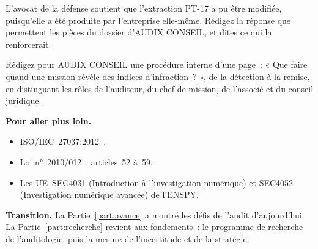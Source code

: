 \begin{boxexo}[title={\ding{45}\quad Exercice~29.9. La défense attaque \niveauexpert}]
L'avocat de la défense soutient que l'extraction PT-17 a pu être modifiée,
puisqu'elle a été produite par l'entreprise elle-même. Rédigez la réponse
que permettent les pièces du dossier d'AUDIX CONSEIL, et dites ce qui la
renforcerait.
\end{boxexo}

\begin{boxexo}[title={\ding{45}\quad Exercice~29.10. Une procédure interne \niveauexpert}]
Rédigez pour AUDIX CONSEIL une procédure interne d'une page~: « Que faire
quand une mission révèle des indices d'infraction~? », de la détection à la
remise, en distinguant les rôles de l'auditeur, du chef de mission, de
l'associé et du conseil juridique.
\end{boxexo}

\bigskip

\begin{boxinfo}
\textbf{Pour aller plus loin.}
\begin{itemize}
    \item ISO/IEC~27037:2012~\cite{iso27037_2012}.
    \item Loi n°~2010/012~\cite{loi2010012}, articles~52 à~59.
    \item Les UE~SEC4031 (Introduction à l'investigation numérique) et
          SEC4052 (Investigation numérique avancée) de l'ENSPY.
\end{itemize}
\end{boxinfo}

\begin{boxinfo}
\textbf{Transition.} La Partie~\ref{part:avance} a montré les défis de
l'audit d'aujourd'hui. La Partie~\ref{part:recherche} revient aux
fondements~: le programme de recherche de l'auditologie, puis la mesure de
l'incertitude et de la stratégie.
\end{boxinfo}
